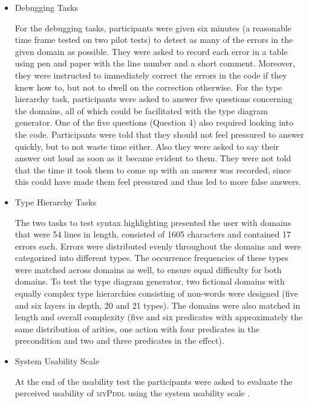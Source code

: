 \documentclass[runningheads]{llncs}
\newcommand{\mypddl}{\textsc{myPddl}\xspace}
\begin{document}
\begin{itemize}
\item Debugging Tasks

  For the debugging tasks, participants were given six minutes (a
  reasonable time frame tested on two pilot tests) to detect as many
  of the errors in the given domain as possible. They were asked to
  record each error in a table using pen and paper with the line
  number and a short comment. Moreover, they were instructed to
  immediately correct the errors in the code if they knew how to, but
  not to dwell on the correction otherwise. For the type hierarchy
  task, participants were asked to answer five questions concerning
  the domains, all of which could be facilitated with the type diagram
  generator. One of the five questions (Question 4) also required
  looking into the code. Participants were told that they should not
  feel pressured to answer quickly, but to not waste time either. Also
  they were asked to say their answer out loud as soon as it became
  evident to them. They were not told that the time it took them to
  come up with an answer was recorded, since this could have made them
  feel pressured and thus led to more false answers.

\item Type Hierarchy Tasks

  The two tasks to test syntax highlighting presented the user with
  domains that were 54 lines in length, consisted of 1605 characters
  and contained 17 errors each. Errors were distributed evenly
  throughout the domains and were categorized into different
  types. The occurrence frequencies of these types were matched across
  domains as well, to ensure equal difficulty for both domains. To
  test the type diagram generator, two fictional domains with equally
  complex type hierarchies consisting of non-words were designed (five
  and six layers in depth, 20 and 21 types). The domains were also
  matched in length and overall complexity (five and six predicates
  with approximately the same distribution of arities, one action with
  four predicates in the precondition and two and three predicates in
  the effect).

\item System Usability Scale

  At the end of the usability test the participants were asked to
  evaluate the perceived usability of \mypddl using the system
  usability scale \cite{brooke1996sus}.

\end{itemize}
\end{document}
